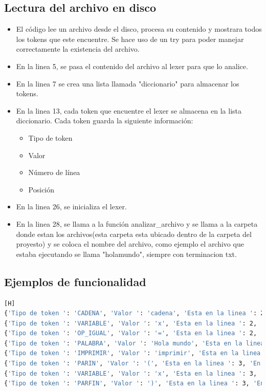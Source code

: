 \documentclass{article}
\begin{document}
\subsection{Lectura del archivo en disco}

\begin{itemize}
    \item El código lee un archivo desde el disco, procesa su contenido y mostrara todos los tokens que este encuentre. Se hace uso de un try para poder manejar correctamente la existencia del archivo.
    \item En la linea 5, se pasa el contenido del archivo al lexer para que lo analice.
    \item En la linea 7 se crea una lista llamada "diccionario" para almacenar los tokens.
    \item En la linea 13, cada token que encuentre el lexer se almacena en la lista diccionario. Cada token guarda la siguiente información: 
    \begin{itemize}
        \item Tipo de token
        \item Valor
        \item Número de línea
        \item Posición
    \end{itemize}
    \item En la linea 26, se inicializa el lexer.
     \item En la linea 28, se llama a la función analizar\_archivo y se llama a la carpeta donde estan los archivos(esta carpeta esta ubicado dentro de la carpeta del proyesto) y se coloca el nombre del archivo, como ejemplo el archivo que estaba ejecutando se llama "holamundo", siempre con terminacion txt.
\end{itemize}

\subsection{Ejemplos de funcionalidad}


\begin{lstlisting}[language=bash,caption={Tokens del Hola Mundo}][H]
{'Tipo de token ': 'CADENA', 'Valor ': 'cadena', 'Esta en la linea ': 2, 'En la posición ': 24}
{'Tipo de token ': 'VARIABLE', 'Valor ': 'x', 'Esta en la linea ': 2, 'En la posición ': 31}
{'Tipo de token ': 'OP_IGUAL', 'Valor ': '=', 'Esta en la linea ': 2, 'En la posición ': 33}
{'Tipo de token ': 'PALABRA', 'Valor ': 'Hola mundo', 'Esta en la linea ': 2, 'En la posición ': 35}
{'Tipo de token ': 'IMPRIMIR', 'Valor ': 'imprimir', 'Esta en la linea ': 3, 'En la posición ': 48}
{'Tipo de token ': 'PARIN', 'Valor ': '(', 'Esta en la linea ': 3, 'En la posición ': 57}
{'Tipo de token ': 'VARIABLE', 'Valor ': 'x', 'Esta en la linea ': 3, 'En la posición ': 58}
{'Tipo de token ': 'PARFIN', 'Valor ': ')', 'Esta en la linea ': 3, 'En la posición ': 59}
\end{lstlisting}
\end{document}
